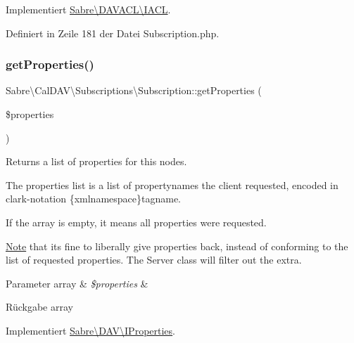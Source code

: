 Implementiert \mbox{\hyperlink{interface_sabre_1_1_d_a_v_a_c_l_1_1_i_a_c_l_a05f531b4ae1a86eab4e6e95b0413390e}{Sabre\textbackslash{}\+D\+A\+V\+A\+C\+L\textbackslash{}\+I\+A\+CL}}.



Definiert in Zeile 181 der Datei Subscription.\+php.

\mbox{\label{class_sabre_1_1_cal_d_a_v_1_1_subscriptions_1_1_subscription_a69806d6c8262031418a9e0e19e36a8b7}} 
\subsubsection{\texorpdfstring{get\+Properties()}{getProperties()}}
{\footnotesize\ttfamily Sabre\textbackslash{}\+Cal\+D\+A\+V\textbackslash{}\+Subscriptions\textbackslash{}\+Subscription\+::get\+Properties (\begin{DoxyParamCaption}\item[{}]{\$properties }\end{DoxyParamCaption})}

Returns a list of properties for this nodes.

The properties list is a list of propertynames the client requested, encoded in clark-\/notation \{xmlnamespace\}tagname.

If the array is empty, it means \textquotesingle{}all properties\textquotesingle{} were requested.

\mbox{\hyperlink{class_note}{Note}} that it\textquotesingle{}s fine to liberally give properties back, instead of conforming to the list of requested properties. The Server class will filter out the extra.


\begin{DoxyParams}[1]{Parameter}
array & {\em \$properties} & \\
\hline
\end{DoxyParams}
\begin{DoxyReturn}{Rückgabe}
array 
\end{DoxyReturn}


Implementiert \mbox{\hyperlink{interface_sabre_1_1_d_a_v_1_1_i_properties_a0d2fcaacf74daaa5cf24ea53a057140a}{Sabre\textbackslash{}\+D\+A\+V\textbackslash{}\+I\+Properties}}.



